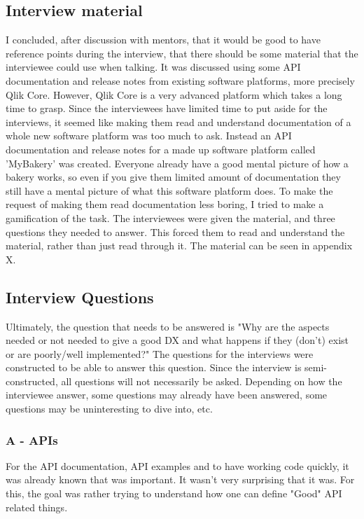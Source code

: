 \documentclass{cslthse-msc}
\begin{document}
    \subsection{Interview material}
    I concluded, after discussion with mentors, that it would be good to have reference points during the interview,
    that there should be some material that the interviewee could use when talking.
    It was discussed using some API documentation and release notes from existing software platforms,
    more precisely Qlik Core. However, Qlik Core is a very advanced platform which takes a long time
    to grasp. Since the interviewees have limited time to put aside for the interviews, it seemed
    like making them read and understand documentation of a whole new software platform was too much to ask.
    Instead an API documentation and release notes for a made up software platform
    called 'MyBakery' was created. Everyone already have a good mental picture of how a bakery works,
    so even if you give them limited amount of documentation they still have a mental picture
    of what this software platform does. To make the request of making them read documentation less boring,
    I tried to make a gamification of the task. The interviewees were given the material, and
    three questions they needed to answer. This forced them to read and understand the material, rather
    than just read through it. The material can be seen in appendix X.

    \subsection{Interview Questions}

    Ultimately, the question that needs to be answered is "Why are the aspects needed or not needed
    to give a good DX and what happens if they (don’t) exist or are poorly/well implemented?"
    The questions for the interviews were constructed to be able to answer this question.
    Since the interview is semi-constructed, all questions will not necessarily be asked.
    Depending on how the interviewee answer, some questions may already have been answered,
    some questions may be uninteresting to dive into, etc.
    \subsubsection{A - APIs}
    For the API documentation, API examples and to have working code quickly, it was already known that was important. It wasn't very surprising that it was.
    For this, the goal was rather trying to understand how one can define "Good" API related things.
\end{document}
